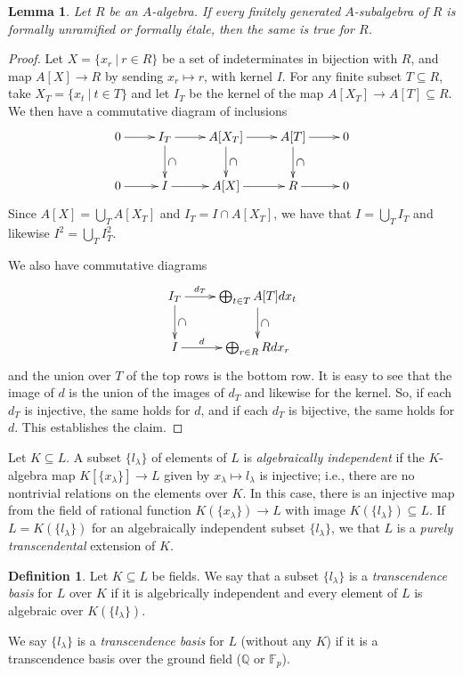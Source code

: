 \documentclass{amsart}[12pt]
\newcommand{\Q}{\mathbb{Q}}
\newcommand{\F}{\mathbb{F}}
\numberwithin{equation}{section}
\theoremstyle{plain} %
\newtheorem{lem}[equation]{Lemma}
\theoremstyle{definition}
\newtheorem{defn}[equation]{Definition}
\theoremstyle{remark}
\begin{document}
\begin{lem} Let $R$ be an $A$-algebra. If every finitely generated $A$-subalgebra of $R$ is formally unramified or formally \'etale, then the same is true for $R$.
\end{lem}
\begin{proof}  Let $X=\{x_r \ | \ r\in R\}$ be a set of indeterminates in bijection with $R$, and map $A[X]\to R$ by sending $x_r\mapsto r$, with kernel $I$. For any finite subset $T\subseteq R$, take $X_T=\{x_t \ |\ t\in T\}$ and let $I_T$ be the kernel of the map $A[X_T]\to A[T] \subseteq R$. We then have a commutative diagram of inclusions
\[ \xymatrix{  0 \ar[r] & I_T \ar[r] \ar[d]^-{\rotatebox{90}{$\supset$}} & A[X_T] \ar[r]\ar[d]^-{\rotatebox{90}{$\supset$}} & A[T] \ar[r]\ar[d]^-{\rotatebox{90}{$\supset$}} & 0 \\  0 \ar[r] & I \ar[r] & A[X] \ar[r] &R \ar[r] & 0}\]
Since $A[X] = \bigcup_T A[X_T]$ and $I_T = I \cap A[X_T]$, we have that $I=\bigcup_T I_T$ and likewise $I^2= \bigcup_T I_T^2$.

We also have commutative diagrams
\[ \xymatrix{ I_T \ar[r]^-{d_T} \ar[d]^-{\rotatebox{90}{$\supset$}} &  \bigoplus_{t\in T} A[T] dx_t \ar[d]^-{\rotatebox{90}{$\supset$}} \\
I \ar[r]^-d &  \bigoplus_{r\in R} R dx_r }\]
and the union over $T$ of the top rows is the bottom row. It is easy to see that the image of $d$ is the union of the images of $d_T$ and likewise for the kernel. So, if each $d_T$ is injective, the same holds for $d$, and if each $d_T$ is bijective, the same holds for $d$. This establishes the claim.
\end{proof}

Let $K\subseteq L$. A subset $\{l_\lambda\}$ of elements of $L$ is \emph{algebraically independent} if the $K$-algebra map $K[\{x_\lambda\}] \to L$ given by $x_{\lambda}\mapsto l_\lambda$ is injective; i.e., there are no nontrivial relations on the elements over $K$. In this case, there is an injective map from the field of rational function $K(\{x_\lambda\}) \to L$ with image $K(\{l_\lambda\})\subseteq L$. If $L=K(\{l_\lambda\})$ for an algebraically independent subset $\{l_\lambda\}$, we that $L$ is a \emph{purely transcendental} extension of $K$.

\begin{defn} Let $K\subseteq L$ be fields. We say that a subset $\{l_\lambda\}$ is a \emph{transcendence basis} for $L$ over $K$ if it is algebrically independent and every element of $L$ is algebraic over $K(\{l_\lambda\})$.

We say $\{l_\lambda\}$ is a \emph{transcendence basis} for $L$ (without any $K$) if it is a transcendence basis over the ground field ($\Q$ or $\F_p$).
\end{defn}
\end{document}
